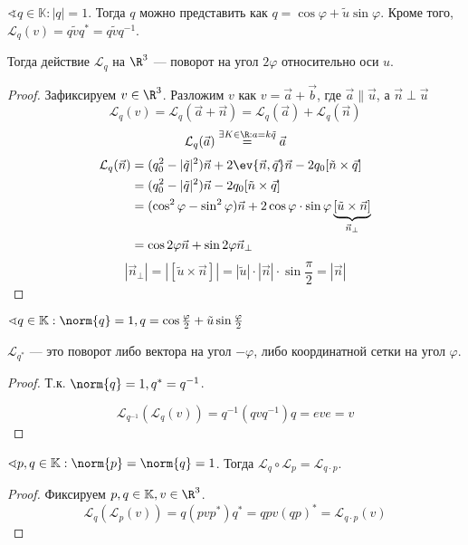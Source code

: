 \begin{theorem}
	\(\sphericalangle q \in \mathbb{K} : |q| = 1\). Тогда \(q\) можно представить как  \(q = \cos\varphi + \tilde{u}\sin\varphi\). Кроме того, \(\mathcal{L}_q(v) = q \tilde{v} q^* = q \tilde{v} q^{-1}\).

	Тогда действие \(\mathcal{L}_q\) на \(\R^3\) --- поворот на угол  \(2 \varphi\) относительно оси  \(u\).
\end{theorem}
\begin{proof}
	Зафиксируем \(v \in \R^3\). Разложим \(v\) как \(v = \vec{a} + \vec{b}\),
	где \(\vec{a} \parallel \vec{u}\), а \(\vec{n} \perp \vec{u}\)
	\[\mathcal{L}_q(v) = \mathcal{L}_q(\vec{a} + \vec{n})
		= \mathcal{L}_q(\vec{a}) + \mathcal{L}_q(\vec{n})\]
	\[\mathcal{L}_q(\vec{a}) \stackrel{\exists K \in \R : a = k \tilde{q}}{=} \vec{a}\]
	\begin{align*}
		\mathcal{L}_q(\vec{n})
		 & = (q_0^2 - |\tilde{q}|^2)\vec{n} + 2 \ev{\vec{n}, \vec{q}} \vec{n} - 2 q_0 [\tilde{n} \times \vec{q}]                                 \\
		 & = (q_0^2 - |\tilde{q}|^2)\vec{n} - 2q_0[\tilde{n} \times \vec{q}]                                                                     \\
		 & = (\cos^2 \varphi - \sin^2 \varphi) \vec{n} + 2 \cos\varphi \cdot \sin\varphi \underbrace{[\tilde{u} \times \vec{n}]}_{\vec{n}_\perp} \\
		 & = \cos 2\varphi \vec{n} + \sin 2\varphi \vec{n}_\perp
	\end{align*}
	\[|\vec{n}_\perp| = |[\tilde{u} \times \vec{n}]| = |\tilde{u}| \cdot |\vec{n}| \cdot \sin \frac{\pi}{2} = |\vec{n}|\]
\end{proof}

\begin{theorem}[\(*\)]
	\(\sphericalangle q \in \mathbb{K} : \norm{q} = 1, q = \cos \frac{\varphi}{2} + \tilde{u} \sin \frac{\varphi}{2}\)

	\(\mathcal{L}_{q^*}\) --- это поворот либо вектора на угол \(-\varphi\), либо координатной сетки на угол \(\varphi\).
\end{theorem}
\begin{proof}
	Т.к. \(\norm{q} = 1, q^* = q^{-1}\).

	\[\mathcal{L}_{q^{-1}}(\mathcal{L}_q(v)) = q^{-1} (q v q^{-1}) q = eve = v\]
\end{proof}

\begin{theorem}
	\(\sphericalangle p, q \in \mathbb{K} : \norm{p} = \norm{q} = 1\).
	Тогда \(\mathcal{L}_q \circ \mathcal{L}_p = \mathcal{L}_{q \cdot p}\).
\end{theorem}
\begin{proof}
	Фиксируем \(p, q \in \mathbb{K}, v \in \R^3\).
	\[\mathcal{L}_q(\mathcal{L}_p(v)) = q (pvp^*) q^* = qpv(qp)^* = \mathcal{L}_{q \cdot p}(v)\]
\end{proof}

